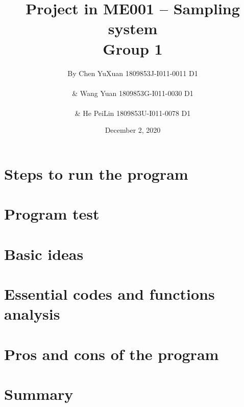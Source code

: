 \documentclass[12pt]{article}
\title{\textbf{Project in ME001 -- Sampling system\\Group 1}}
\author{By Chen YuXuan 1809853J-I011-0011 D1\\ \\
\& Wang Yuan 1809853G-I011-0030 D1\\ \\
\& He PeiLin 1809853U-I011-0078 D1}
\date{December 2, 2020}
\begin{document}
\maketitle

\newpage
\tableofcontents
\newpage

\section{Steps to run the program}


\section{Program test}


\section{Basic ideas}


\section{Essential codes and functions analysis}


\section{Pros and cons of the program}


\section{Summary}

\end{document}
